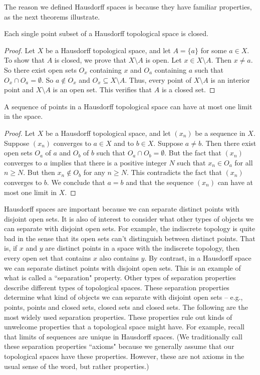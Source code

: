 The reason we defined Hausdorff spaces is because they have familiar properties, as the next theorems illustrate. 

\begin{theorem} Each single point subset of a Hausdorff topological space is closed.
\end{theorem}

\begin{proof} Let $X$ be a Hausdorff topological space, and let $A = \{a\}$ for some $a \in X$. To show that $A$ is closed, we prove that $X \setminus A$ is open. Let $x \in X \setminus A$. Then $x \neq a$. So there exist open sets $O_x$ containing $x$ and $O_a$ containing $a$ such that $O_x \cap O_a = \emptyset$. So $a \notin O_x$ and $O_x \subseteq X \setminus A$. Thus, every point of $X \setminus A$ is an interior point and $X \setminus A$ is an open set. This verifies that $A$ is a closed set.
\end{proof}


\begin{theorem} A sequence of points in a Hausdorff topological space can have at most one limit in the space.
\end{theorem}

\begin{proof} Let $X$ be a Hausdorff topological space, and let $(x_n)$ be a sequence in $X$. Suppose $(x_n)$ converges to $a \in X$ and to $b \in X$. Suppose $a \neq b$. Then there exist open sets $O_a$ of $a$ and $O_b$ of $b$ such that $O_a \cap O_b = \emptyset$. But the fact that $(x_n)$ converges to $a$ implies that there is a positive integer $N$ such that $x_n \in O_a$ for all $n \geq N$. But then $x_n \notin O_b$ for any $n \geq N$. This contradicts the fact that $(x_n)$ converges to $b$. We conclude that $a=b$ and that the sequence $(x_n)$ can have at most one limit in $X$. 
\end{proof}

Hausdorff spaces are important because we can separate distinct points with disjoint open sets. It is also of interest to consider what other types of objects we can separate with disjoint open sets. For example, the indiscrete topology is quite bad in the sense that its open sets can't distinguish between distinct points. That is, if $x$ and $y$ are distinct points in a space with the indiscrete topology, then every open set that contains $x$ also contains $y$. By contrast, in a Hausdorff space we can separate distinct points with disjoint open sets. This is an example of what is called a ``separation" property. Other types of separation properties describe different types of topological spaces. These separation properties determine what kind of objects we can separate with disjoint open sets -- e.g., points, points and closed sets, closed sets and closed sets. The following are the most widely used separation properties. These properties rule out kinds of unwelcome properties that a topological space might have. For example, recall that limits of sequences are unique in Hausdorff spaces. (We traditionally call these separation properties ``axioms" because we generally assume that our topological spaces have these properties. However, these are not axioms in the usual sense of the word, but rather properties.)

